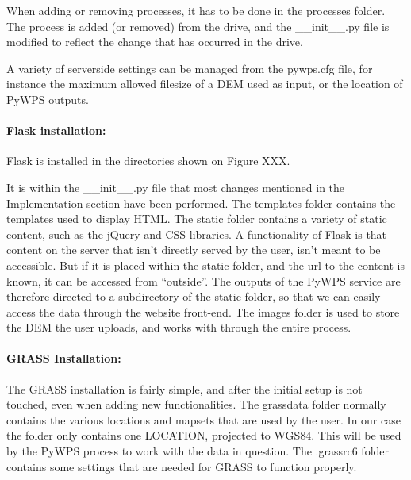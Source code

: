When adding or removing processes, it has to be done in the processes folder. The process is added (or removed) from the drive, and the \_\_init\_\_.py file is modified to reflect the change that has occurred in the drive.

A variety of serverside settings can be managed from the pywps.cfg file, for instance the maximum allowed filesize of a DEM used as input, or the location of PyWPS outputs.

\paragraph{Flask installation:}Flask is installed in the directories shown on Figure XXX.\\

\begin{figure}[h]
\end{figure}

It is within the \_\_init\_\_.py file that most changes mentioned in the Implementation section have been performed. The templates folder contains the templates used to display HTML. The static folder contains a variety of static content, such as the jQuery and CSS libraries. A functionality of Flask is that content on the server that isn't directly served by the user, isn't meant to be accessible. But if it is placed within the static folder, and the url to the content is known, it can be accessed from “outside”. The outputs of the PyWPS service are therefore directed to a subdirectory of the static folder, so that we can easily access the data through the website front-end.
The images folder is used to store the DEM the user uploads, and works with through the entire process.\\

\paragraph{GRASS Installation:}The GRASS installation is fairly simple, and after the initial setup is not touched, even when adding new functionalities. The grassdata folder normally contains the various locations and mapsets that are used by the user. In our case the folder only contains one LOCATION, projected to WGS84. This will be used by the PyWPS process to work with the data in question. 
The .grassrc6 folder contains some settings that are needed for GRASS to function properly.

